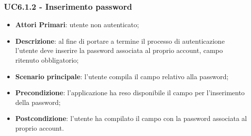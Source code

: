 \subsubsection{UC6.1.2 - Inserimento password}
\begin{itemize}
	\item \textbf{Attori Primari}: utente non autenticato;
	\item \textbf{Descrizione}: al fine di portare a termine il processo di autenticazione l'utente deve inserire la password associata al proprio account, campo ritenuto obbligatorio;
	\item \textbf{Scenario principale}: l'utente compila il campo relativo alla password;	
	\item \textbf{Precondizione}: l'applicazione ha reso disponibile il campo per l'inserimento della password;
	\item \textbf{Postcondizione}: l'utente ha compilato il campo con la password associata al proprio account.
\end{itemize}


